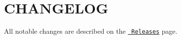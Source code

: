 \chapter{CHANGELOG}
\hypertarget{md_pkiclassroomrescheduler_2src_2main_2frontend_2node__modules_2babel-plugin-transform-react-rem39cf3e64d931ef192d779d78b9c071b8}{}\label{md_pkiclassroomrescheduler_2src_2main_2frontend_2node__modules_2babel-plugin-transform-react-rem39cf3e64d931ef192d779d78b9c071b8}
All notable changes are described on the \href{https://github.com/oliviertassinari/babel-plugin-transform-react-remove-prop-types/releases}{\texttt{ Releases}} page. 